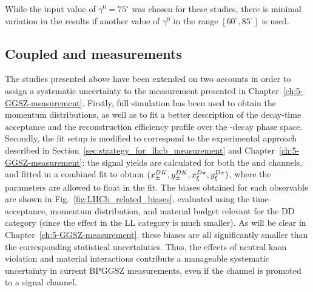 While the input value of $\gamma^0=75^\circ$ was chosen for these studies, there is minimal variation in the results if another value of $\gamma^0$ in the range $[60^\circ, 85^\circ]$ is used.


\subsection{\texorpdfstring{Coupled \BtoDK and \BtoDpi measurements}
{Coupled B->DK and B->Dpi measurements}}%
\label{sub:the_impact_on_coupled_btodk_and_btodpi_measurements}

The studies presented above have been extended on two accounts in order to assign a systematic uncertainty to the \lhcb measurement presented in Chapter~\ref{ch:5-GGSZ-measurement}. Firstly, full \lhcb simulation has been used to obtain the momentum distributions, as well as to fit a better description of the decay-time acceptance and the reconstruction efficiency profile over the \D-decay phase space. Secondly, the fit setup is modified to correspond to the experimental approach described in Section~\ref{sec:strategy_for_lhcb_measurement} and Chapter~\ref{ch:5-GGSZ-measurement}: the signal yields are calculated for both the \BtoDK and \BtoDpi channels, and fitted in a combined fit to obtain $(x_\pm^{{D}{K}}, y_\pm^{{D}{K}}, x_\xi^{{D}\pi}, y_\xi^{{D}\pi})$, where the \Fi parameters are allowed to float in the fit. The biases obtained for each observable are shown in Fig.~\ref{fig:LHCb_related_biases}, evaluated using the time-acceptance, momentum distribution, and material budget relevant for the DD category (since the effect in the LL category is much smaller). As will be clear in Chapter~\ref{ch:5-GGSZ-measurement}, these biases are all significantly smaller than the corresponding statistical uncertainties. Thus, the effects of neutral kaon \CP violation and material interactions contribute a manageable systematic uncertainty in current BPGGSZ measurements, even if the \BtoDpi channel is promoted to a signal channel.

